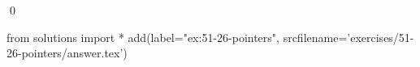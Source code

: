 
\begin{ex}
  \label{ex:51-26-pointers}
  
  \qed
\end{ex}
\begin{python0}
from solutions import *
add(label="ex:51-26-pointers",
    srcfilename='exercises/51-26-pointers/answer.tex')
\end{python0}
